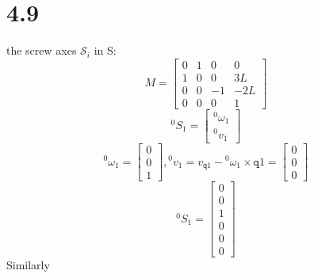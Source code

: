 \documentclass[onecolumn,oneside]{SUSTechHomework}
\begin{document}
  \section*{4.9}
  the screw axes \(\mathcal{S}_i\) in {S}:
  \[M = \begin{bmatrix}
    0 & 1 & 0 & 0 \\ 1 & 0 & 0 & 3L \\0 & 0 & -1 & -2L \\ 0 & 0 & 0 & 1
  \end{bmatrix}\]
  \[
    {}^0S_1 = \begin{bmatrix}
      {}^0\omega_1 \\ {}^0v_1
    \end{bmatrix}
  \]
  \[{}^0\omega_1 = \begin{bmatrix}
     0 \\ 0 \\ 1
  \end{bmatrix}, 
  {}^0v_1 = v_{\mathtt{q}1} - {}^0\omega_1 \times \mathtt{q}1 = \begin{bmatrix}
    0 \\ 0 \\ 0
  \end{bmatrix}  
  \]
  \[{}^0S_1 = \begin{bmatrix}
     0 \\ 0 \\ 1 \\ 0 \\ 0 \\ 0
  \end{bmatrix}\]
  Similarly
\end{document}
